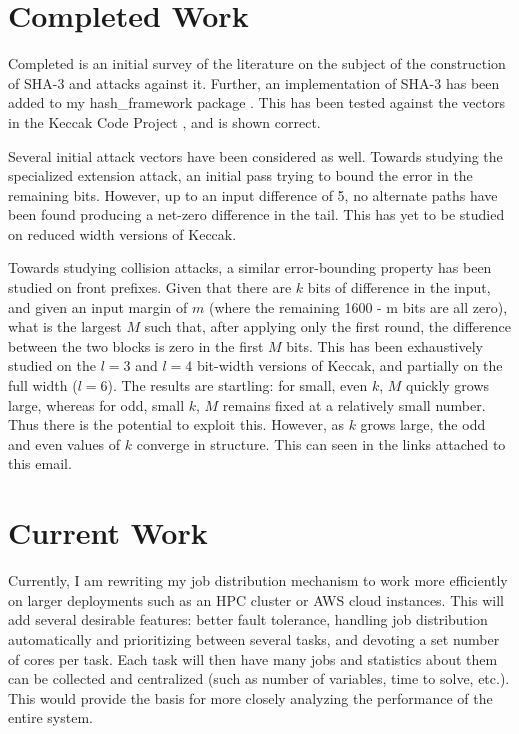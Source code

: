 \documentclass[10pt,twocolumn,twoside]{pnas-new}
\begin{document}
\section{Completed Work} \label{sec:completed}

    Completed is an initial survey of the literature on the subject of the
construction of SHA-3 and attacks against it. Further, an implementation
of SHA-3 has been added to my hash\_framework package \cite{hf}. This has been
tested against the vectors in the Keccak Code Project \cite{KeccakCodePackage},
and is shown correct.

    Several initial attack vectors have been considered as well. Towards
studying the specialized extension attack, an initial pass trying to bound the
error in the remaining bits. However, up to an input difference of 5, no
alternate paths have been found producing a net-zero difference in the tail.
This has yet to be studied on reduced width versions of Keccak.

Towards studying collision attacks, a similar error-bounding property has been
studied on front prefixes. Given that there are $k$ bits of difference in the
input, and given an input margin of $m$ (where the remaining 1600 - m bits
are all zero), what is the largest $M$ such that, after applying
only the first round, the difference between the two blocks is zero in the
first $M$ bits. This has been exhaustively studied on the $l=3$ and $l=4$
bit-width versions of Keccak, and partially on the full width ($l=6$). The
results are startling: for small, even $k$, $M$ quickly grows large, whereas
for odd, small $k$, $M$ remains fixed at a relatively small number. Thus
there is the potential to exploit this. However, as $k$ grows large, the
odd and even values of $k$ converge in structure. This can seen in the links
attached to this email.

\section{Current Work} \label{sec:current}

    Currently, I am rewriting my job distribution mechanism to work more
efficiently on larger deployments such as an HPC cluster or AWS cloud
instances. This will add several desirable features: better fault tolerance,
handling job distribution automatically and prioritizing between several
tasks, and devoting a set number of cores per task. Each task will then have
many jobs and statistics about them can be collected and centralized (such as
number of variables, time to solve, etc.). This would provide the basis for
more closely analyzing the performance of the entire system.
\end{document}
